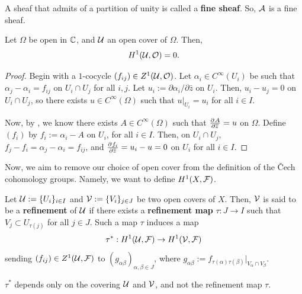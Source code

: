 \documentclass[11pt]{article}
\begin{document}
\begin{defn}
A sheaf that admits of a partition of unity is called a \textbf{fine sheaf}. So, $\mathcal A$ is a fine sheaf.
\end{defn}


\begin{thm}
    Let $\Omega$ be open in $\mathbb{C}$, and $\mathcal U$ an open cover of $\Omega$. Then,
    \[
    H^1(\mathcal U,\mathcal O)=0.
    \]
\end{thm}

\begin{proof}

Begin with a $1$-cocycle $(f_{ij})\in Z^1(\mathcal U,\mathcal O)$. Let $\alpha _i \in C^\infty (U_i)$ be such that $\alpha_j - \alpha _i = f_{ij}$ on $U_i \cap U_j$ for all $i,j$. Let $u_i := \partial \alpha _i / \partial \bar z$ on $U_i$. Then, $u_i - u_j=0$ on $U_i \cap U_j$, so there exists $u \in C^\infty (\Omega)$ such that $u|_{U_i}=u_i$ for all $i \in I$.

Now, by , we know there exists $A \in C^\infty (\Omega)$ such that $\frac{\partial^{}A}{\partial \overline z^{}}=u$ on $\Omega$. Define $(f_i)$ by $f_i := \alpha _i - A$ on $U_i$, for all $i \in I$. Then, on $U_i \cap U_j$, $f_j -f_i = \alpha _j -\alpha _i = f_{ij}$, and $\frac{\partial^{}f_i}{\partial \overline z^{}}=u_i-u=0$ on $U_i$ for all $i \in I$.
\end{proof}

Now, we aim to remove our choice of open cover from the definition of the \v{C}ech cohomology groups. Namely, we want to define $H^1(X, \mathcal F)$.

\begin{defn}
Let $\mathcal U:=\{U_i\}_{i \in I}$ and $\mathcal V:= \{V_i\}_{j \in J}$ be two open covers of $X$. Then, $\mathcal V$ is said to be a \textbf{refinement} of $\mathcal U$ if there exists a \textbf{refinement map} $\tau :J \to I$ such that $V_j \subset U_{\tau(j)}$ for all $j \in J$. Such a map $\tau$ induces a map
\[
\tau^* : H^1 (\mathcal U,\mathcal F) \to H^1 (\mathcal V,\mathcal F)
\]
sending $(f_{ij})\in Z^1(\mathcal U,\mathcal F)$ to $(g_{\alpha\beta})_{\alpha,\beta \in J}$, where $g_{\alpha \beta}:= f_{\tau(\alpha) \tau (\beta)}|_{V_\alpha \cap V_\beta}$.
\end{defn}

\begin{notethm*}[Check]
    $\tau^*$ depends only on the covering $\mathcal U$ and $\mathcal V$, and not the refinement map $\tau$.
\end{notethm*}
\end{document}
